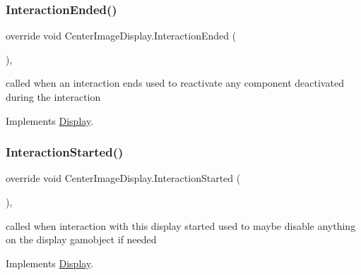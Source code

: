 \mbox{\label{class_center_image_display_ac78f5ea36aa445bb3d12124f1baf814d}} 
\subsubsection{\texorpdfstring{Interaction\+Ended()}{InteractionEnded()}}
{\footnotesize\ttfamily override void Center\+Image\+Display.\+Interaction\+Ended (\begin{DoxyParamCaption}{ }\end{DoxyParamCaption})\hspace{0.3cm}{\ttfamily [protected]}, {\ttfamily [virtual]}}



called when an interaction ends used to reactivate any component deactivated during the interaction 



Implements \mbox{\hyperlink{class_display_a6fd38485267e1b78f1d1dfb589ec4ae0}{Display}}.

\mbox{\label{class_center_image_display_a2944541a38bcc65b7fff15200c9f0fc3}} 
\subsubsection{\texorpdfstring{Interaction\+Started()}{InteractionStarted()}}
{\footnotesize\ttfamily override void Center\+Image\+Display.\+Interaction\+Started (\begin{DoxyParamCaption}{ }\end{DoxyParamCaption})\hspace{0.3cm}{\ttfamily [protected]}, {\ttfamily [virtual]}}



called when interaction with this display started used to maybe disable anything on the display gamobject if needed 



Implements \mbox{\hyperlink{class_display_a21c51fcf185403197a78a5acfd2065de}{Display}}.

